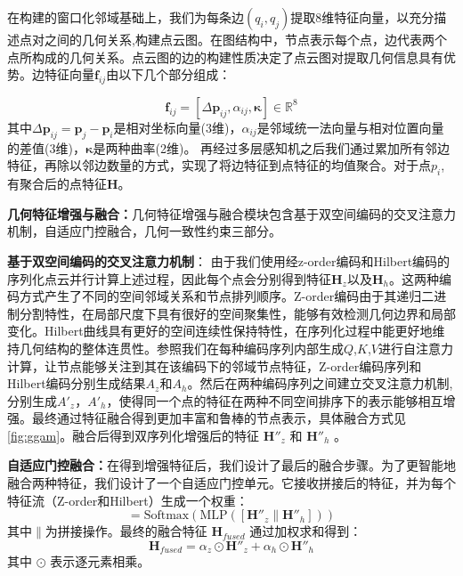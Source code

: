 \documentclass[preprint,12pt]{elsarticle}
\begin{document}
在构建的窗口化邻域基础上，我们为每条边$(q_i, q_j)$提取8维特征向量，以充分描述点对之间的几何关系,构建点云图。在图结构中，节点表示每个点，边代表两个点所构成的几何关系。点云图的边的构建性质决定了点云图对提取几何信息具有优势。边特征向量$\mathbf{f}_{ij}$由以下几个部分组成：
 
\begin{equation}
	\mathbf{f}_{ij} = [\Delta\mathbf{p}_{ij}, \alpha_{ij},  \boldsymbol{\kappa}] \in \mathbb{R}^8
\end{equation}
其中$\Delta\mathbf{p}_{ij} = \mathbf{p}_j - \mathbf{p}_i$是相对坐标向量(3维)，$\alpha_{ij}$是邻域统一法向量与相对位置向量的差值(3维)，$\boldsymbol{\kappa}$是两种曲率(2维)。
再经过多层感知机之后我们通过累加所有邻边特征，再除以邻边数量的方式，实现了将边特征到点特征的均值聚合。对于点$p_i$,有聚合后的点特征$\mathbf{H}$。


\textbf{几何特征增强与融合：}几何特征增强与融合模块包含基于双空间编码的交叉注意力机制，自适应门控融合，几何一致性约束三部分。

\textbf{基于双空间编码的交叉注意力机制}：
由于我们使用经z-order编码和Hilbert编码的序列化点云并行计算上述过程，因此每个点会分别得到特征$\mathbf{H}_{z}$以及$\mathbf{H}_{h}$。这两种编码方式产生了不同的空间邻域关系和节点排列顺序。Z-order编码由于其递归二进制分割特性，在局部尺度下具有很好的空间聚集性，能够有效检测几何边界和局部变化。Hilbert曲线具有更好的空间连续性保持特性，在序列化过程中能更好地维持几何结构的整体连贯性。参照\cite{attention}我们在每种编码序列内部生成$Q$,$K$,$V$进行自注意力计算，让节点能够关注到其在该编码下的邻域节点特征，Z-order编码序列和Hilbert编码分别生成结果$A_z$和$A_h$。然后在两种编码序列之间建立交叉注意力机制,分别生成${A}'_z$，${A}'_h$，使得同一个点的特征在两种不同空间排序下的表示能够相互增强。最终通过特征融合得到更加丰富和鲁棒的节点表示，具体融合方式见\cref{fig:ggam}。融合后得到双序列化增强后的特征 $\mathbf{H}''_z$ 和 $\mathbf{H}''_h$ 。


\textbf{自适应门控融合：}在得到增强特征后，我们设计了最后的融合步骤。为了更智能地融合两种特征，我们设计了一个自适应门控单元。它接收拼接后的特征，并为每个特征流（Z-order和Hilbert）生成一个权重：
\begin{equation}
	[\alpha_z, \alpha_h] = \text{Softmax}(\text{MLP}([\mathbf{H}''_z \| \mathbf{H}''_h]))
	\label{eq:adaptive_gate}
\end{equation}
其中$\|$为拼接操作。最终的融合特征 $\mathbf{H}_{fused}$ 通过加权求和得到：
\begin{equation}
	\mathbf{H}_{fused} = \alpha_z \odot \mathbf{H}''_z + \alpha_h \odot \mathbf{H}''_h
	\label{eq:gated_fusion}
\end{equation}
其中 $\odot$ 表示逐元素相乘。
\end{document}
